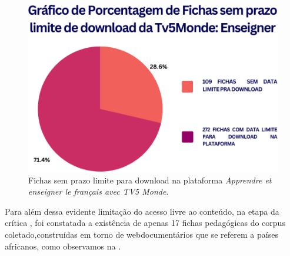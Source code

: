 \documentclass[portuguese]{textolivre}
\begin{document}
\begin{figure}[h]
    \centering
    \begin{minipage}{.55\textwidth}
    \includegraphics[width=\linewidth]{Fig4.png}
    \caption{Fichas sem prazo limite para download na plataforma \textit{Apprendre et enseigner le français avec TV5 Monde}.}
    \label{fig4}
    \end{minipage}
\end{figure}

Para além dessa evidente limitação do acesso livre ao conteúdo, na etapa da crítica \cite{deschaine_five_2015}, foi constatada a existência de apenas 17 fichas pedagógicas do corpus coletado,construídas em torno de webdocumentários que se referem a países africanos, como observamos na .
\end{document}
